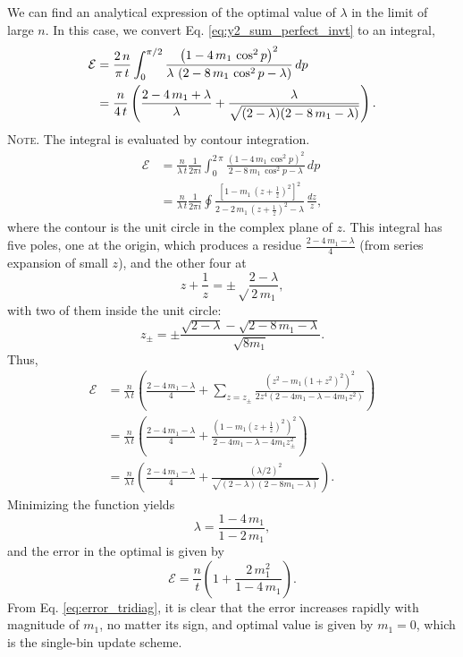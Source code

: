 \documentclass[reprint]{revtex4-1}
\newcommand{\note}[1]{{\color{DarkGreen}\footnotesize \textsc{Note.} #1}}
\begin{document}
We can find an analytical expression
of the optimal value of $\lambda$
in the limit of large $n$.
%
In this case,
we convert Eq.
\eqref{eq:y2_sum_perfect_invt}
to an integral,
$$
\begin{aligned}
\mathcal E
&=
\frac{2 \, n}{\pi \, t}
\int_0^{\pi/2}
\frac{ \left(1 - 4 \, m_1 \, \cos^2 p \right)^2 }
{ \lambda \, \left(2 - 8 \, m_1 \, \cos^2 p - \lambda \right) }
\, dp
\notag \\
&=
\frac{n}{4 \, t}
\left(
  \frac{2 - 4 \, m_1 + \lambda}{ \lambda }
  +
  \frac{ \lambda }
  { \sqrt{ (2 - \lambda) (2 - 8 \, m_1 - \lambda) } }
\right).
\end{aligned}
$$
\note{The integral is evaluated by contour integration.
$$
\begin{aligned}
\mathcal E
&=
\frac{n}{\lambda \, t}
\frac{1}{2 \pi i}
\int_0^{2 \, \pi}
\frac{ \left(1 - 4 \, m_1 \, \cos^2 p \right)^2 }
{ 2 - 8 \, m_1 \, \cos^2 p - \lambda }
\, dp
\\
&=
\frac{n}{\lambda \, t}
\frac{1}{2 \pi i}
\oint
\frac{ \left[1 - m_1 \, \left(z+\frac{1}{z}\right)^2 \right]^2 }
{ 2 - 2 \, m_1 \, \left(z + \frac{1}{z}\right)^2 - \lambda }
\, \frac{dz}{z},
\end{aligned}
$$
where the contour is the unit circle
in the complex plane of $z$.
%
This integral has five poles, one at the origin,
which produces a residue $\frac{2 - 4 \, m_1 - \lambda}{4}$
(from series expansion of small $z$),
and the other four at
$$
z + \frac{1}{z} = \pm\sqrt\frac{2-\lambda}{2 \, m_1},
$$
with two of them inside the unit circle:
$$
z_\pm = \pm \frac{\sqrt{2-\lambda} -\sqrt{2 - 8 \, m_1 - \lambda}}
{\sqrt{8 m_1}}.
$$
Thus,
$$
\begin{aligned}
  \mathcal E
&=
\frac{n}{\lambda \, t}
\left(
 \frac{2 - 4 \, m_1 - \lambda}{4}
 +
 \sum_{z = z_{\pm} }
 \frac{ \left(z^2 - m_1 (1 + z^2)^2 \right)^2 }
 { 2 z^4 (2 - 4 m_1 - \lambda - 4 m_1 z^2) }
\right)
\\
&=
\frac{n}{\lambda \, t}
\left(
  \frac{2 - 4 \, m_1 - \lambda}{4}
 +
 \frac{ \left(1 - m_1 \left(z + \frac{1}{z} \right)^2 \right)^2 }
 { 2 - 4 m_1 - \lambda - 4 m_1 z_{\pm}^2 }
\right)
\\
&=
\frac{n}{\lambda \, t}
\left(
  \frac{2 - 4 \, m_1 - \lambda}{4}
 +
 \frac{ (\lambda/2)^2 }
 { \sqrt{(2-\lambda) (2 - 8 m_1 -\lambda)} }
\right).
\end{aligned}
$$
}
%
Minimizing the function yields
%
\begin{equation}
\lambda = \frac{1 - 4 \, m_1} { 1 - 2 \, m_1 },
\label{eq:lambda_tridiag}
\end{equation}
%
and the error in the optimal is given by
%
\begin{equation}
\mathcal E
=
\frac{n}{t}
\left(
  1+ \frac{2 \, m_1^2}{1-4 \, m_1}
\right).
\label{eq:error_tridiag}
\end{equation}
%
From Eq. \eqref{eq:error_tridiag},
it is clear that the error
increases rapidly with magnitude of $m_1$,
no matter its sign,
and optimal value is given by $m_1 = 0$,
which is the single-bin update scheme.
\end{document}
